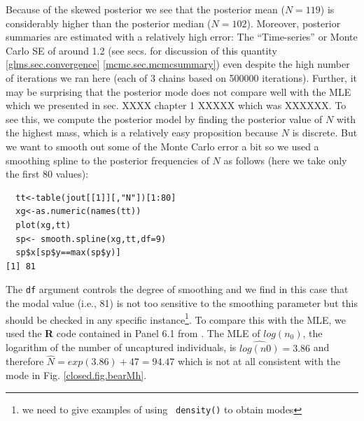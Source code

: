 Because of the skewed posterior we see that the posterior mean
($N=119$) is considerably higher than the posterior median
($N=102$). Moreover, posterior summaries are estimated with a
relatively high error: The ``Time-series'' or Monte Carlo SE of around
1.2 (see secs.  for discussion of this quantity
\ref{glms.sec.convergence} \ref{mcmc.sec.mcmcsummary}) even despite
the high number of iterations we ran here (each of 3 chains based on
500000 iterations).  Further, it may be surprising that the posterior
mode does not compare well with the MLE which we presented in
sec. XXXX chapter 1 XXXXX which was XXXXXX.
To see this, we compute the posterior model by finding
the posterior value of $N$ with the highest mass, which is a
relatively easy proposition because $N$ is discrete.
 But we want to smooth out some of the Monte
Carlo error a bit so we used a smoothing spline to the posterior
frequencies of $N$ as follows (here we take only the first 80 values):
\begin{verbatim}
  tt<-table(jout[[1]][,"N"])[1:80]
  xg<-as.numeric(names(tt))
  plot(xg,tt)
  sp<- smooth.spline(xg,tt,df=9)
  sp$x[sp$y==max(sp$y)]
[1] 81
\end{verbatim}
The \mbox{\tt df} argument controls the degree of smoothing and we
find in this case that the modal value (i.e., 81) is not too sensitive
to the smoothing parameter but this should be checked in any specific
instance\footnote{we need to give examples of using \mbox{\tt
    density()} to obtain modes}.
To compare this with the MLE, we used
the {\bf R} code contained in Panel 6.1 from \citet{royle_dorazio:2008}.  The
MLE of $log(n_{0})$, the logarithm of the number of uncaptured
individuals, is $\widehat{log(n0)} = 3.86$ and therefore $\hat{N} =
exp(3.86)+47 = 94.47$ which is not at all consistent with the
mode in
Fig. \ref{closed.fig.bearMh}.

